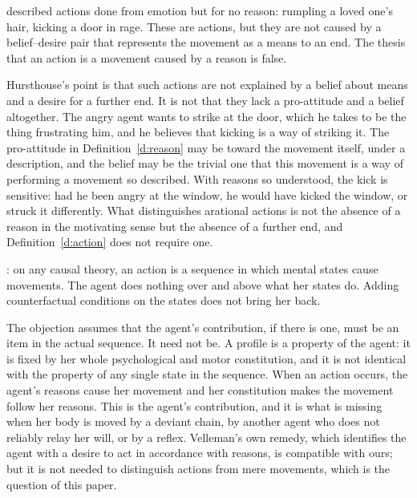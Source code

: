 \documentclass{situationist-preprint}
\begin{document}
\begin{objection}\label{o:arational}
\citet{Hursthouse1991} described actions done from emotion but for no reason: rumpling a loved one's hair, kicking a door in rage. These are actions, but they are not caused by a belief--desire pair that represents the movement as a means to an end. The thesis that an action is a movement caused by a reason is false.
\end{objection}

\begin{reply}
Hursthouse's point is that such actions are not explained by a belief about means and a desire for a further end. It is not that they lack a pro-attitude and a belief altogether. The angry agent wants to strike at the door, which he takes to be the thing frustrating him, and he believes that kicking is a way of striking it. The pro-attitude in Definition~\ref{d:reason} may be toward the movement itself, under a description, and the belief may be the trivial one that this movement is a way of performing a movement so described. With reasons so understood, the kick is sensitive: had he been angry at the window, he would have kicked the window, or struck it differently. What distinguishes arational actions is not the absence of a reason in the motivating sense but the absence of a further end, and Definition~\ref{d:action} does not require one.
\end{reply}

\begin{objection}\label{o:agent}
\citet{Velleman1992}: on any causal theory, an action is a sequence in which mental states cause movements. The agent does nothing over and above what her states do. Adding counterfactual conditions on the states does not bring her back.
\end{objection}

\begin{reply}
The objection assumes that the agent's contribution, if there is one, must be an item in the actual sequence. It need not be. A profile is a property of the agent: it is fixed by her whole psychological and motor constitution, and it is not identical with the property of any single state in the sequence. When an action occurs, the agent's reasons cause her movement and her constitution makes the movement follow her reasons. This is the agent's contribution, and it is what is missing when her body is moved by a deviant chain, by another agent who does not reliably relay her will, or by a reflex. Velleman's own remedy, which identifies the agent with a desire to act in accordance with reasons, is compatible with ours; but it is not needed to distinguish actions from mere movements, which is the question of this paper.
\end{reply}
\end{document}

